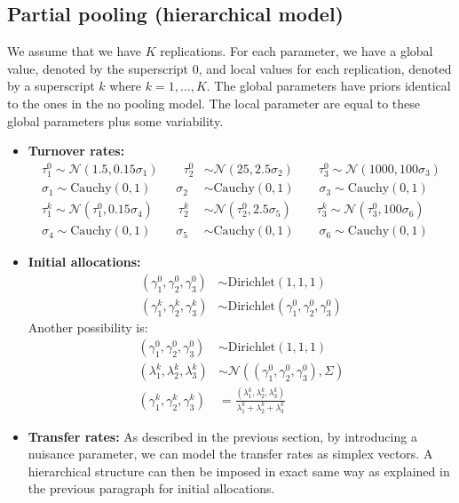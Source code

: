 \documentclass[10pt,a4paper]{article}
\begin{document}
\subsection{Partial pooling (hierarchical model)}
We assume that we have $K$ replications. For each parameter, we have a global value, denoted by the superscript $0$, and local values for each replication, denoted by a superscript $k$ where $k=1,\ldots, K$.
The global parameters have priors identical to the ones in the no pooling model. The local parameter are equal to these global parameters plus some variability. 

\begin{itemize}
\item {\bf Turnover rates: }
\begin{align*}
\tau_1^0  \sim  \mathcal{N}(1.5, 0.15 \sigma_1) \qquad
\tau_2^0  &\sim \mathcal{N}(25, 2.5 \sigma_2) \qquad
\tau_3^0 \sim \mathcal{N}(1000,100 \sigma_3) \\ \sigma_1 \sim \text{Cauchy}(0,1) \qquad  \sigma_2 &\sim \text{Cauchy}(0,1) \qquad \sigma_3 \sim \text{Cauchy}(0,1) \\
\tau_1^k \sim \mathcal{N}(\tau_1^0, 0.15 \sigma_4) \qquad
\tau_2^k &\sim \mathcal{N}(\tau_2^0, 2.5 \sigma_5) \qquad 
\tau_3^k \sim \mathcal{N}(\tau_3^0, 100 \sigma_6) \\ \sigma_4 \sim \text{Cauchy}(0,1) \qquad  \sigma_5 &\sim \text{Cauchy}(0,1) \qquad \sigma_6 \sim \text{Cauchy}(0,1)
\end{align*}
\item {\bf Initial allocations: }
\begin{align*}
(\gamma_1^0, \gamma_2^0, \gamma_3^0) &\sim \text{Dirichlet}(1,1,1) \\
(\gamma_1^k, \gamma_2^k, \gamma_3^k) &\sim \text{Dirichlet}(\gamma_1^0, \gamma_2^0, \gamma_3^0)
\end{align*}
Another possibility is:
\begin{align*}
(\gamma_1^0, \gamma_2^0, \gamma_3^0) &\sim \text{Dirichlet}(1,1,1) \\
(\lambda_1^k, \lambda_2^k, \lambda_3^k) &\sim \mathcal{N}((\gamma_1^0, \gamma_2^0, \gamma_3^0), \Sigma) \\
(\gamma_1^k, \gamma_2^k, \gamma_3^k) & = \frac{(\lambda_1^k, \lambda_2^k, \lambda_3^k)}{\lambda_1^k+ \lambda_2^k+ \lambda_3^k}
\end{align*}
\item {\bf Transfer rates: } As described in the previous section, by introducing a nuisance parameter, we can model the transfer rates as simplex vectors. A hierarchical structure can then be imposed in exact same way as explained in the previous paragraph for initial allocations. 
\end{itemize}
\end{document}
